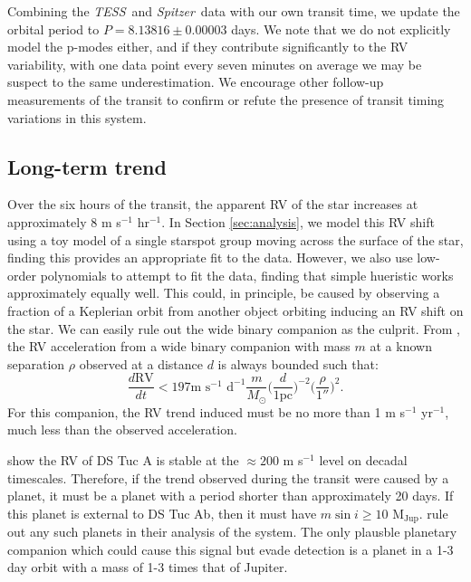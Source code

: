 \documentclass[twocolumn]{aastex63}
\newcommand{\tess}{{\it TESS}}
\newcommand{\spitz}{{\it Spitzer}}
\newcommand{\mjup}{{M$_\textrm{Jup}$}}
\begin{document}
Combining the \tess\ and \spitz\ data with our own transit time, we update the orbital period to $P= 8.13816 \pm 0.00003$ days. 
We note that we do not explicitly model the p-modes either, and if they contribute significantly to the RV variability, with one data point every seven minutes on average we may be suspect to the same underestimation.
We encourage other follow-up measurements of the transit to confirm or refute the presence of transit timing variations in this system.




\subsection{Long-term trend}
\label{sec:trend}

Over the six hours of the transit, the apparent RV of the star increases at approximately 8 m s$^{-1}$ hr$^{-1}$. 
In Section \ref{sec:analysis}, we model this RV shift using a toy model of a single 
starspot group moving across the surface of the star, finding this provides an appropriate fit to the data. 
However, we also use low-order polynomials to attempt to fit the data, finding that simple hueristic works approximately equally well.
This could, in principle, be caused by observing a fraction of a Keplerian orbit from another object orbiting inducing an RV shift on the star. 
We can easily rule out the wide binary companion as the culprit.
From \citet{Liu02}, the RV acceleration from a wide binary companion with mass $m$ at a known separation $\rho$ observed at a distance $d$ is always bounded such that:
\begin{equation}
    \frac{d\textrm{RV}}{dt} < 197 \textrm{m } \textrm{s}^{-1} \textrm{ d}^{-1}
    \frac{m}{M_\odot} \bigg(\frac{d}{1\textrm{pc}}\bigg)^{-2} \bigg(\frac{\rho}{1''}\bigg)^{2}.
\end{equation}
For this companion, the RV trend induced must be no more than 1 m s$^{-1}$ yr$^{-1}$, much less than the observed acceleration.

\citet{Benatti19} show the RV of DS Tuc A is stable at the $\approx 200$ m s$^{-1}$ level on decadal timescales. 
Therefore, if the trend observed during the transit were caused by a planet, it must be a planet with a period shorter than approximately 20 days. 
If this planet is external to DS Tuc Ab, then it must have $m \sin i \geq 10$ \mjup. 
\citet{Benatti19} rule out any such planets in their analysis of the system.
The only plausble planetary companion which could cause this signal but evade detection is a planet in a 1-3 day orbit with a mass of 1-3 times that of Jupiter. 
\end{document}
